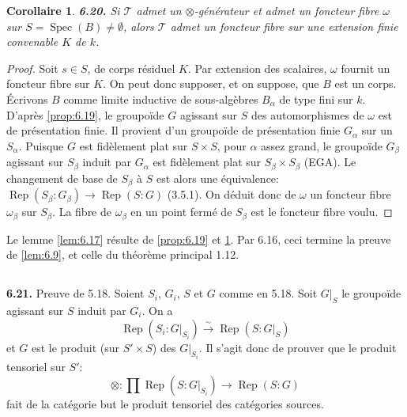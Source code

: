 \documentclass[12pt,a4paper]{article}
\theoremstyle{plain}
\newtheorem{corollary}[theorem]{Corollaire}
\theoremstyle{definition}
\theoremstyle{remark}
\DeclareMathOperator{\Spec}{Spec}
\DeclareMathOperator{\Rep}{Rep}
\begin{document}
\begin{corollary}\label{cor:6.20}
\textbf{6.20.} Si $\mathcal{T}$ admet un $\otimes$-générateur et admet un foncteur fibre $\omega$ sur $S = \Spec(B) \neq \emptyset$, alors $\mathcal{T}$ admet un foncteur fibre sur une extension finie convenable $K$ de $k$.
\end{corollary}

\begin{proof}
Soit $s \in S$, de corps résiduel $K$. Par extension des scalaires, $\omega$ fournit un foncteur fibre sur $K$. On peut donc supposer, et on suppose, que $B$ est un corps. Écrivons $B$ comme limite inductive de sous-algèbres $B_\alpha$ de type fini sur $k$. D'après \ref{prop:6.19}, le groupoïde $G$ agissant sur $S$ des automorphismes de $\omega$ est de présentation finie. Il provient d'un groupoïde de présentation finie $G_\alpha$ sur un $S_\alpha$. Puisque $G$ est fidèlement plat sur $S \times S$, pour $\alpha$ assez grand, le groupoïde $G_\beta$ agissant sur $S_\beta$ induit par $G_\alpha$ est fidèlement plat sur $S_\beta \times S_\beta$ (EGA). Le changement de base de $S_\beta$ à $S$ est alors une équivalence: $\Rep(S_\beta:G_\beta) \to \Rep(S:G)$ (3.5.1). On déduit donc de $\omega$ un foncteur fibre $\omega_\beta$ sur $S_\beta$. La fibre de $\omega_\beta$ en un point fermé de $S_\beta$ est le foncteur fibre voulu.
\end{proof}

Le lemme \ref{lem:6.17} résulte de \ref{prop:6.19} et \ref{cor:6.20}. Par 6.16, ceci termine la preuve de \ref{lem:6.9}, et celle du théorème principal 1.12.

\subsection{}

\textbf{6.21.} Preuve de 5.18. Soient $S_i$, $G_i$, $S$ et $G$ comme en 5.18. Soit $G|_S$ le groupoïde agissant sur $S$ induit par $G_i$. On a
\[
\Rep(S_i : G|_{S_i}) \xrightarrow{\sim} \Rep(S:G|_S)
\]
et $G$ est le produit (sur $S' \times S$) des $G|_{S_i}$. Il s'agit donc de prouver que le produit tensoriel sur $S'$:
\begin{equation}\label{eq:6.21.1}
\otimes : \prod \Rep(S:G|_{S_i}) \to \Rep(S:G)
\end{equation}
fait de la catégorie but le produit tensoriel des catégories sources.
\end{document}
